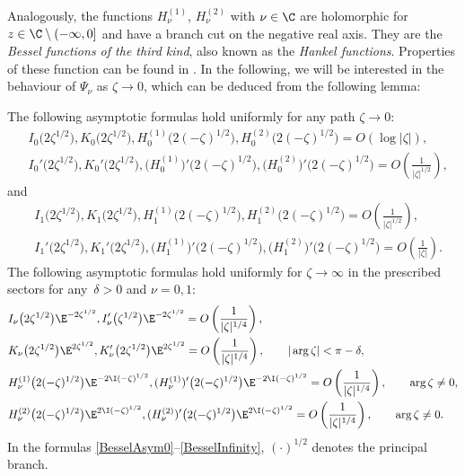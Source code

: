 Analogously, the functions $H^{(1)}_\nu$, $H^{(2)}_\nu$ with $\nu \in \C$ are holomorphic for $z\in\C \setminus (-\infty, 0]$ and have a branch cut on the negative real axis. They are the \emph{Bessel functions of the third kind}, also known as the \emph{Hankel functions}. Properties of these function can be found in \cite[Section~10]{DLMF}. In the following, we will be interested in the behaviour of $\Psi_\nu$ as $\zeta \to 0$, which can be deduced from the following lemma:
\begin{Lemma}
The following asymptotic formulas hold uniformly for any path $\zeta \to 0$:
\begin{align}
& I_0\big(2\zeta^{1/2}\big), K_0\big(2\zeta^{1/2}\big), H^{(1)}_0\big(2(-\zeta)^{1/2}\big), H^{(2)}_0\big(2(-\zeta)^{1/2}\big) = O(\log |\zeta|),\nonumber
 \\
 &I_0'\big(2\zeta^{1/2}\big), K_0'\big(2\zeta^{1/2}\big), \big(H^{(1)}_0\big)'\big(2(-\zeta)^{1/2}\big), \big(H^{(2)}_0\big)'\big(2(-\zeta)^{1/2}\big) = O\left(\frac{1}{|\zeta|^{1/2}}\right),\label{BesselAsym0}
\end{align}
 and
\begin{align}
 &I_1\big(2\zeta^{1/2}\big), K_1\big(2\zeta^{1/2}\big), H^{(1)}_1\big(2(-\zeta)^{1/2}\big), H^{(2)}_1\big(2(-\zeta)^{1/2}\big) = O\left(\frac{1}{|\zeta|^{1/2}}\right),\nonumber
 \\
 &I_1'\big(2\zeta^{1/2}\big), K_1'\big(2\zeta^{1/2}\big), \big(H^{(1)}_1\big)'\big(2(-\zeta)^{1/2}\big), \big(H^{(2)}_1\big)'\big(2(-\zeta)^{1/2}\big) = O\left(\frac{1}{|\zeta|}\right).\label{BesselAsym1}
\end{align}
The following asymptotic formulas hold uniformly for $\zeta \to \infty$ in the prescribed sectors for any~$\delta >0$ and $\nu = 0,1$:
\begin{align}
& I_\nu\big(2\zeta^{1/2}\big)\E^{-2\zeta^{1/2}}, I_\nu'\big(\zeta^{1/2}\big)\E^{-2\zeta^{1/2}} = O\left(\frac{1}{|\zeta|^{1/4}} \right),\nonumber
 \\
 &K_\nu\big(2\zeta^{1/2}\big)\E^{2\zeta^{1/2}}, K_\nu'\big(2\zeta^{1/2}\big)\E^{2\zeta^{1/2}} = O\left(\frac{1}{|\zeta|^{1/4}} \right),
 \qquad|\arg \zeta|<\pi-\delta,\nonumber
 \\
 &H^{(1)}_\nu\big(2(-\zeta)^{1/2}\big)\E^{-2\I(-\zeta)^{1/2}}, (H^{(1)}_\nu)'\big(2(-\zeta)^{1/2}\big)\E^{-2\I(-\zeta)^{1/2}} = O\left(\frac{1}{|\zeta|^{1/4}} \right), \qquad \arg \zeta \not = 0,\nonumber
 \\
 &H^{(2)}_\nu\big(2(-\zeta)^{1/2}\big)\E^{2\I(-\zeta)^{1/2}}, (H^{(2)}_\nu)'\big(2(-\zeta)^{1/2}\big)\E^{2\I(-\zeta)^{1/2}} = O\left(\frac{1}{|\zeta|^{1/4}} \right), \qquad \arg \zeta \not = 0.\label{BesselInfinity}
\end{align}
In the formulas \eqref{BesselAsym0}--\eqref{BesselInfinity}, $(\cdot)^{1/2}$ denotes the principal branch.
\end{Lemma}

